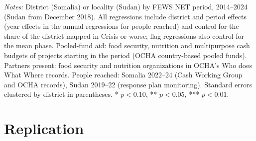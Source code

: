 \documentclass[11pt]{article}
\begin{document}
\begin{appendices}
\begin{table}[htbp]
\centering
\caption{Aid and FEWS NET within Somalia and Sudan}\label{tab:within}
\scriptsize

\par\vspace{4pt}\begin{minipage}{\textwidth}\scriptsize \textit{Notes:} District (Somalia) or locality (Sudan) by FEWS NET period, 2014--2024 (Sudan from December 2018). All regressions include district and period effects (year effects in the annual regressions for people reached) and control for the share of the district mapped in Crisis or worse; flag regressions also control for the mean phase. Pooled-fund aid: food security, nutrition and multipurpose cash budgets of projects starting in the period (OCHA country-based pooled funds). Partners present: food security and nutrition organizations in OCHA's Who does What Where records. People reached: Somalia 2022--24 (Cash Working Group and OCHA records), Sudan 2019--22 (response plan monitoring). Standard errors clustered by district in parentheses. * $p<0.10$, ** $p<0.05$, *** $p<0.01$.\end{minipage}
\end{table}

\section{Replication}\label{app:replication}


\end{appendices}
\end{document}
